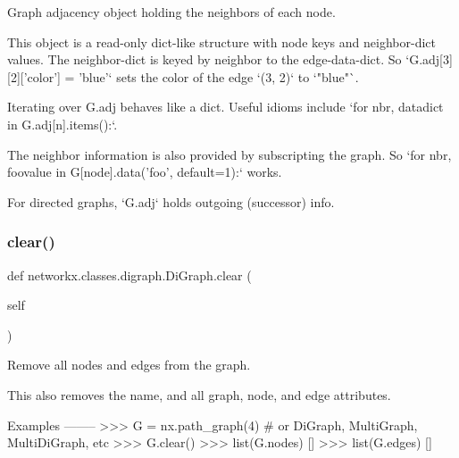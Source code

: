 \begin{DoxyVerb}Graph adjacency object holding the neighbors of each node.

This object is a read-only dict-like structure with node keys
and neighbor-dict values.  The neighbor-dict is keyed by neighbor
to the edge-data-dict.  So `G.adj[3][2]['color'] = 'blue'` sets
the color of the edge `(3, 2)` to `"blue"`.

Iterating over G.adj behaves like a dict. Useful idioms include
`for nbr, datadict in G.adj[n].items():`.

The neighbor information is also provided by subscripting the graph.
So `for nbr, foovalue in G[node].data('foo', default=1):` works.

For directed graphs, `G.adj` holds outgoing (successor) info.
\end{DoxyVerb}
 \mbox{\label{classnetworkx_1_1classes_1_1digraph_1_1DiGraph_a6690d460bd07932e64a82e5d0cad8812}} 
\subsubsection{\texorpdfstring{clear()}{clear()}}
{\footnotesize\ttfamily def networkx.\+classes.\+digraph.\+Di\+Graph.\+clear (\begin{DoxyParamCaption}\item[{}]{self }\end{DoxyParamCaption})}

\begin{DoxyVerb}Remove all nodes and edges from the graph.

This also removes the name, and all graph, node, and edge attributes.

Examples
--------
>>> G = nx.path_graph(4)  # or DiGraph, MultiGraph, MultiDiGraph, etc
>>> G.clear()
>>> list(G.nodes)
[]
>>> list(G.edges)
[]\end{DoxyVerb}
 \mbox{\label{classnetworkx_1_1classes_1_1digraph_1_1DiGraph_a7d99a80ec69ee5f0c3e2eef6485a8f27}} 
